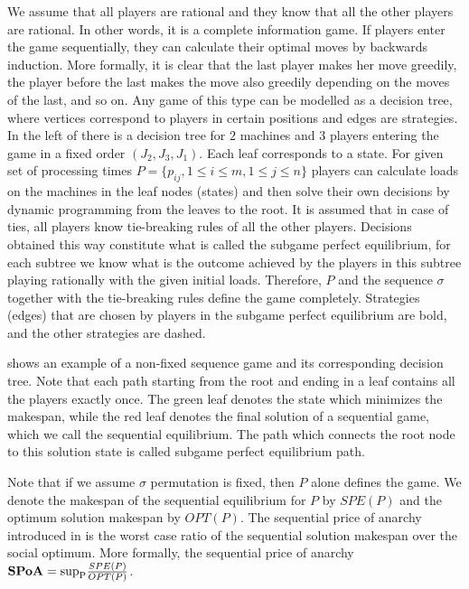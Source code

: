 \documentclass[runningheads]{llncs}
\newcommand{\SPoA}{\textbf{SPoA}\xspace}
\begin{document}
We assume that all players are rational and they  know that all the other players are rational. In other words, it is a complete information game. If players enter the game sequentially, they can calculate their optimal moves by backwards induction. More formally, it is clear that the last player makes her move greedily, the player before the last makes the move also greedily depending on the moves of the last, and so on.  Any game of this type can be modelled as a decision tree, where vertices correspond to players in certain positions and edges are strategies. In the left of  there is a decision tree for $2$ machines and $3$ players entering the game in a fixed order $(J_2, J_3, J_1)$.  Each leaf corresponds to a state. For given set of processing times $P=\{p_{ij}, 1\leq i \leq m, 1\leq j \leq n\}$ players can calculate loads on the machines in the leaf nodes (states) and then solve their own decisions by dynamic programming from the leaves to the root. It is assumed that in  case of ties, all players know tie-breaking rules of all the other players. Decisions obtained this way constitute what is called the subgame perfect equilibrium, for each subtree we know what is the outcome achieved by the players in this subtree playing rationally with the given initial loads. Therefore, $P$ and the sequence $\sigma$ together with the tie-breaking rules define the game completely. Strategies (edges) that are chosen by players in the subgame perfect equilibrium are bold, and the other strategies are dashed. 

 shows an example of a non-fixed sequence game and its corresponding decision tree. Note that each path starting from the root and ending in a leaf contains all the players exactly once. The green leaf denotes the state which minimizes the makespan, while the red leaf denotes the final solution of a sequential game, which we call the sequential equilibrium. The path which connects the root node to this solution state is called subgame perfect equilibrium path. 

Note that if we assume $\sigma$ permutation is fixed, then $P$ alone defines the game. We denote the makespan of the sequential equilibrium for $P$ by $SPE(P)$ and the optimum solution makespan by $OPT(P)$. The sequential price of anarchy introduced in \cite{originalSPOA} is the worst case ratio of the sequential solution makespan over the social optimum. More formally, the sequential price of anarchy $\text{\SPoA} = \text{sup}_{\text{P}} \frac{SPE(P)}{OPT(P)}$.
\end{document}
